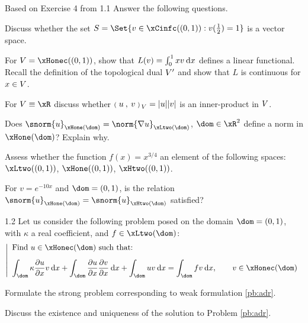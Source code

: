 \begin{tmaxrcs}{Based on Exercise 4 from \cite{MIT}}{1.1}
Answer the following questions.

\begin{tmatsks}
\item Discuss whether the set $S = \Set{ v \in \xCinfc((0,1)) : v(\frac{1}{2}) = 1 }$ is a vector space.
\item For $\xV = \xHonec((0,1))$, show that $L(v) =\int_0^1 xv \hspace{.5ex}{\mathrm d} x$ defines a linear functional. Recall the definition of the topological dual ${V}'$ and show that $L$ is continuous for $x \in {V}$.
\item For $\xV \equiv \xR$ discuss whether ${{\scriptstyle\mathbf{(}}\;u\:,\: v \;{\scriptstyle\mathbf{)}}}_{\,{V}} = |u| |v|$ is an inner-product in ${V}$.
\item Does $\snorm{u}_{\xHone(\dom)} = \norm{\nabla u}_{\xLtwo(\dom)}$, $\dom\in\xR^2$ define a norm in $\xHone(\dom)$? Explain why.
\item Assess whether the function $f(x) = x^{3/4}$ an element of the following spaces: $\xLtwo((0,1))$, $\xHone((0,1))$, $\xHtwo((0,1))$.
\item For $v = e^{-10x}$ and $\dom = (0,1)$, is the relation $\snorm{u}_{\xHone(\dom)} = \snorm{u}_{\xHtwo(\dom)}$ satisfied?
\end{tmatsks}
\end{tmaxrcs}

\begin{tmaxrcs}{}{1.2}
Let us consider the following problem posed on the domain $\dom = (0, 1)$, with $\kappa$ a real coefficient, and $f\in\xLtwo(\dom)$:
\begin{equation}\label{pb:adr}
\left\lvert
\begin{array}{ll}
\mbox{Find $u \in \xHonec(\dom)$ such that:}\\[2ex]
\displaystyle \int_\dom \kappa \pddx{u} v \md x + \int_\dom \pddx{u} \pddx{v} \md x + \int_\dom u v \md x = \int_\dom f v \md x, \qquad v \in \xHonec(\dom)
\end{array}
\right .
\end{equation}
\begin{tmatsks}
\item Formulate the strong problem corresponding to weak formulation \eqref{pb:adr}.
\item Discuss the existence and uniqueness of the solution to Problem \eqref{pb:adr}.
\end{tmatsks}
\end{tmaxrcs}

